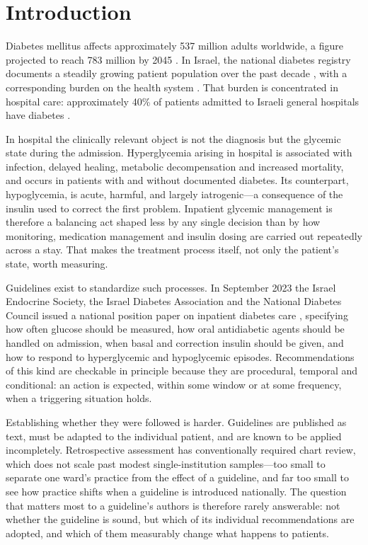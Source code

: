 \section{Introduction}
\label{sec:introduction}

Diabetes mellitus affects approximately 537 million adults worldwide, a
figure projected to reach 783 million by 2045
\citep{idf-atlas-10th-edition-2021}. In Israel, the national diabetes
registry documents a steadily growing patient population over the past
decade
\citep{israel-national-center-disease-control-diabetes-registry-report-2012-2022},
with a corresponding burden on the health system
\citep{summary-cost-diabetes-israel-2018}. That burden is concentrated in
hospital care: approximately 40\% of patients admitted to Israeli general
hospitals have diabetes \citep{hochberg2023inpatient}.

In hospital the clinically relevant object is not the diagnosis but the
glycemic state during the admission. Hyperglycemia arising in hospital is
associated with infection, delayed healing, metabolic decompensation and
increased mortality, and occurs in patients with and without documented
diabetes. Its counterpart, hypoglycemia, is acute, harmful, and largely
iatrogenic---a consequence of the insulin used to correct the first problem.
Inpatient glycemic management is therefore a balancing act shaped less by any
single decision than by how monitoring, medication management and insulin
dosing are carried out repeatedly across a stay. That makes the treatment
process itself, not only the patient's state, worth measuring.

Guidelines exist to standardize such processes. In September 2023 the Israel
Endocrine Society, the Israel Diabetes Association and the National Diabetes
Council issued a national position paper on inpatient diabetes care
\citep{hochberg2023inpatient}, specifying how often glucose should be
measured, how oral antidiabetic agents should be handled on admission, when
basal and correction insulin should be given, and how to respond to
hyperglycemic and hypoglycemic episodes. Recommendations of this kind are
checkable in principle because they are procedural, temporal and
conditional: an action is expected, within some window or at some frequency,
when a triggering situation holds.

Establishing whether they were followed is harder. Guidelines are published
as text, must be adapted to the individual patient, and are known to be
applied incompletely. Retrospective assessment has conventionally required
chart review, which does not scale past modest single-institution
samples---too small to separate one ward's practice from the effect of a
guideline, and far too small to see how practice shifts when a guideline is
introduced nationally. The question that matters most to a guideline's
authors is therefore rarely answerable: not whether the guideline is sound,
but which of its individual recommendations are adopted, and which of them
measurably change what happens to patients.

